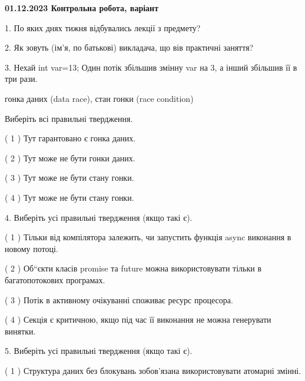 \documentclass[12pt, ukrainian]{article}
\begin{document}
\vspace{4mm}
\newpage
\begin {large}

\textbf{01.12.2023 Контрольна робота, варіант  }\par


{
1. По яких днях тижня відбувались лекції з предмету?



\vspace{5mm}
2. Як зовуть (ім'я, по батькові) викладача, що вів практичні заняття?



\vspace{5mm}
3. Нехай int var=13; Один потік збільшив змінну var на 3, а інший збільшив її в три рази.

гонка даних (data race), стан гонки (race condition)

Виберіть всі правильні твердження.\par
\vspace{2mm}
( 1 ) Тут гарантовано є гонка даних.%

( 2 ) Тут може не бути гонки даних.%

( 3 ) Тут може не бути стану гонки.%

( 4 ) Тут може не бути стану гонки.%


\vspace{5mm}
4. Виберіть усі правильні твердження (якщо такі є).\par
\vspace{2mm}

( 1 ) Тільки від компілятора залежить, чи запустить функція async виконання в новому потоці.%

( 2 ) Об“єкти класів promise та future можна використовувати тільки в багатопотокових програмах.%

( 3 ) Потік в активному очікуванні споживає ресурс процесора.%

( 4 ) Секція є критичною, якщо під час її виконання не можна генерувати винятки.%


\vspace{5mm}
5. Виберіть усі правильні твердження (якщо такі є).\par
\vspace{2mm}

( 1 ) Структура даних без блокувань зобов’язана використовувати атомарні змінні.%

}
\end{large}
\end{document}
